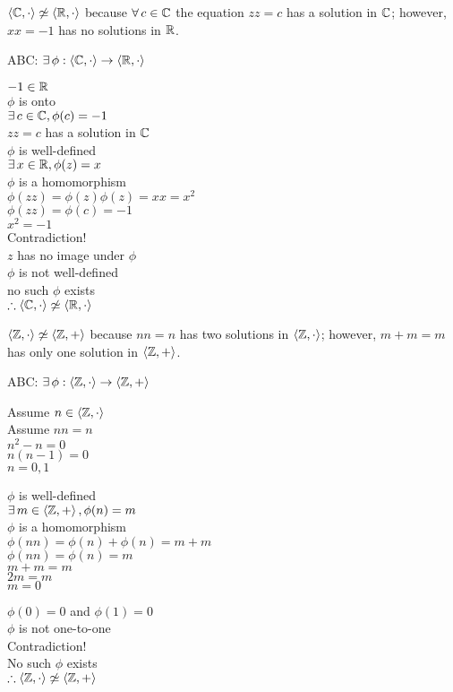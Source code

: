 \documentclass[letterpaper,12pt,fleqn]{article}
\newcommand{\p}{\phi}
\newcommand{\bas}[2]{\left<#1,#2\right>}
\begin{document}
\begin{example}
  $\bas{\C}{\cdot}\not\simeq\bas{\R}{\cdot}$ because $\forall\,c\in\mathbb{C}$ the
  equation $zz=c$ has a solution in $\mathbb{C}$; however, $xx=-1$ has no solutions in
  $\mathbb{R}$.

  ABC: $\exists\,\p:\bas{\C}{\cdot}\to\bas{\R}{\cdot}$
  
  $-1\in\mathbb{R}$ \\
  $\p$ is onto \\
  $\exists\,c\in\C,\p(c)=-1$ \\
  $zz=c$ has a solution in $\mathbb{C}$ \\
  $\p$ is well-defined \\
  $\exists\,x\in\R,\p(z)=x$ \\
  $\p$ is a homomorphism \\
  $\p(zz)=\p(z)\p(z)=xx=x^2$ \\
  $\p(zz)=\p(c)=-1$ \\
  $x^2=-1$ \\
  Contradiction! \\
  $z$ has no image under $\p$ \\
  $\p$ is not well-defined \\
  no such $\p$ exists \\
  $\therefore \bas{\C}{\cdot}\not\simeq\bas{\R}{\cdot}$
\end{example}

\begin{example}
  $\bas{\Z}{\cdot}\not\simeq\bas{\Z}{+}$ because $nn=n$ has two solutions in
  $\bas{\Z}{\cdot}$; however, $m+m=m$ has only one solution in $\bas{\Z}{+}$.

  ABC: $\exists\,\p:\bas{\Z}{\cdot}\to\bas{\Z}{+}$

  Assume $n\in\bas{\Z}{\cdot}$ \\
  Assume $nn=n$ \\
  $n^2-n=0$ \\
  $n(n-1)=0$ \\
  $n=0,1$

  $\p$ is well-defined \\
  $\exists\,m\in\bas{\Z}{+},\p(n)=m$ \\
  $\p$ is a homomorphism \\
  $\p(nn)=\p(n)+\p(n)=m+m$ \\
  $\p(nn)=\p(n)=m$ \\
  $m+m=m$ \\
  $2m=m$ \\
  $m=0$

  $\p(0)=0$ and $\p(1)=0$ \\
  $\p$ is not one-to-one \\
  Contradiction! \\
  No such $\p$ exists \\
  $\therefore \bas{\Z}{\cdot}\not\simeq\bas{\Z}{+}$
\end{example}
\end{document}
